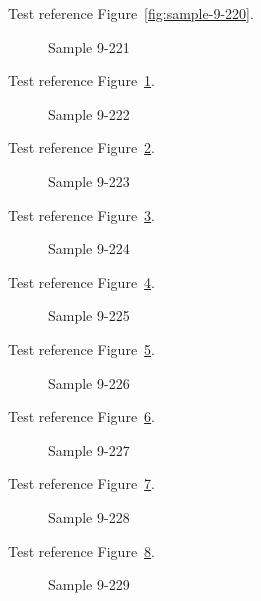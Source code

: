 Test reference Figure~\ref{fig:sample-9-220}.

\begin{figure}[tbhp]
\caption{Sample 9-221}
\label{fig:sample-9-221}
\end{figure}

Test reference Figure~\ref{fig:sample-9-221}.

\begin{figure}[tbhp]
\caption{Sample 9-222}
\label{fig:sample-9-222}
\end{figure}

Test reference Figure~\ref{fig:sample-9-222}.

\begin{figure}[tbhp]
\caption{Sample 9-223}
\label{fig:sample-9-223}
\end{figure}

Test reference Figure~\ref{fig:sample-9-223}.

\begin{figure}[tbhp]
\caption{Sample 9-224}
\label{fig:sample-9-224}
\end{figure}

Test reference Figure~\ref{fig:sample-9-224}.

\begin{figure}[tbhp]
\caption{Sample 9-225}
\label{fig:sample-9-225}
\end{figure}

Test reference Figure~\ref{fig:sample-9-225}.

\begin{figure}[tbhp]
\caption{Sample 9-226}
\label{fig:sample-9-226}
\end{figure}

Test reference Figure~\ref{fig:sample-9-226}.

\begin{figure}[tbhp]
\caption{Sample 9-227}
\label{fig:sample-9-227}
\end{figure}

Test reference Figure~\ref{fig:sample-9-227}.

\begin{figure}[tbhp]
\caption{Sample 9-228}
\label{fig:sample-9-228}
\end{figure}

Test reference Figure~\ref{fig:sample-9-228}.

\begin{figure}[tbhp]
\caption{Sample 9-229}
\label{fig:sample-9-229}
\end{figure}


